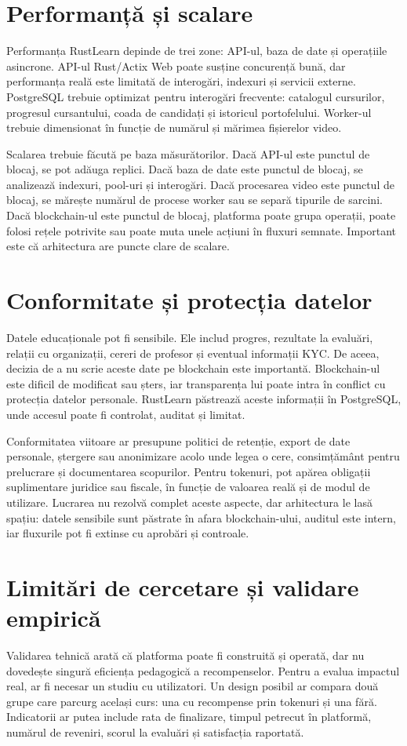 \section{Performanță și scalare}
Performanța RustLearn depinde de trei zone: API-ul, baza de date și operațiile asincrone. API-ul Rust/Actix Web poate susține concurență bună, dar performanța reală este limitată de interogări, indexuri și servicii externe. PostgreSQL trebuie optimizat pentru interogări frecvente: catalogul cursurilor, progresul cursantului, coada de candidați și istoricul portofelului. Worker-ul trebuie dimensionat în funcție de numărul și mărimea fișierelor video.

Scalarea trebuie făcută pe baza măsurătorilor. Dacă API-ul este punctul de blocaj, se pot adăuga replici. Dacă baza de date este punctul de blocaj, se analizează indexuri, pool-uri și interogări. Dacă procesarea video este punctul de blocaj, se mărește numărul de procese worker sau se separă tipurile de sarcini. Dacă blockchain-ul este punctul de blocaj, platforma poate grupa operații, poate folosi rețele potrivite sau poate muta unele acțiuni în fluxuri semnate. Important este că arhitectura are puncte clare de scalare.

\section{Conformitate și protecția datelor}
Datele educaționale pot fi sensibile. Ele includ progres, rezultate la evaluări, relații cu organizații, cereri de profesor și eventual informații KYC. De aceea, decizia de a nu scrie aceste date pe blockchain este importantă. Blockchain-ul este dificil de modificat sau șters, iar transparența lui poate intra în conflict cu protecția datelor personale. RustLearn păstrează aceste informații în PostgreSQL, unde accesul poate fi controlat, auditat și limitat.

Conformitatea viitoare ar presupune politici de retenție, export de date personale, ștergere sau anonimizare acolo unde legea o cere, consimțământ pentru prelucrare și documentarea scopurilor. Pentru tokenuri, pot apărea obligații suplimentare juridice sau fiscale, în funcție de valoarea reală și de modul de utilizare. Lucrarea nu rezolvă complet aceste aspecte, dar arhitectura le lasă spațiu: datele sensibile sunt păstrate în afara blockchain-ului, auditul este intern, iar fluxurile pot fi extinse cu aprobări și controale.

\section{Limitări de cercetare și validare empirică}
Validarea tehnică arată că platforma poate fi construită și operată, dar nu dovedește singură eficiența pedagogică a recompenselor. Pentru a evalua impactul real, ar fi necesar un studiu cu utilizatori. Un design posibil ar compara două grupe care parcurg același curs: una cu recompense prin tokenuri și una fără. Indicatorii ar putea include rata de finalizare, timpul petrecut în platformă, numărul de reveniri, scorul la evaluări și satisfacția raportată.

